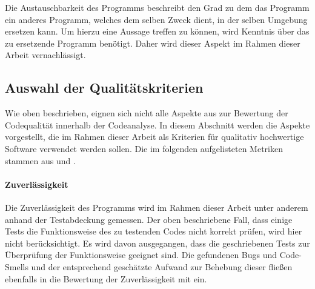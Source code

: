 \documentclass[
	oneside,  %
	ngerman, 
	final, 
	11pt, 
	a4paper, 
	1.1headlines, 
	headinclude=false, 
	footinclude=false, 
	mpinclude=false, 
	pagesize, 
	onecolumn, 
	titlepage, 
	parskip=half, 
	headsepline, 
	chapterprefix=false, 
	version=first, 
	listof=totoc, 
	bibliography=totoc, 
	toc=graduated, 
	fleqn
]{scrbook}
\begin{document}
Die Austauschbarkeit des Programms beschreibt den Grad zu dem das Programm ein anderes Programm, welches dem selben Zweck dient, in der selben Umgebung ersetzen kann.
Um hierzu eine Aussage treffen zu können, wird Kenntnis über das zu ersetzende Programm benötigt.
Daher wird dieser Aspekt im Rahmen dieser Arbeit vernachlässigt.

\subsection{Auswahl der Qualitätskriterien}
\label{Auswahl_Kriterien}
Wie oben beschrieben, eignen sich nicht alle Aspekte aus \cite{ISO-25010} zur Bewertung der Codequalität innerhalb der Codeanalyse.
In diesem Abschnitt werden die Aspekte vorgestellt, die im Rahmen dieser Arbeit als Kriterien für qualitativ hochwertige Software verwendet werden sollen.
Die im folgenden aufgelisteten Metriken stammen aus \cite{Ch2021} und \cite{So2021}.

\paragraph{Zuverlässigkeit}
Die Zuverlässigkeit des Programms wird im Rahmen dieser Arbeit unter anderem anhand der Testabdeckung gemessen.
Der oben beschriebene Fall, dass einige Tests die Funktionsweise des zu testenden Codes nicht korrekt prüfen, wird hier nicht berücksichtigt.
Es wird davon ausgegangen, dass die geschriebenen Tests zur Überprüfung der Funktionsweise geeignet sind.
Die gefundenen Bugs und Code-Smells und der entsprechend geschätzte Aufwand zur Behebung dieser fließen ebenfalls in die Bewertung der Zuverlässigkeit mit ein.
\end{document}
